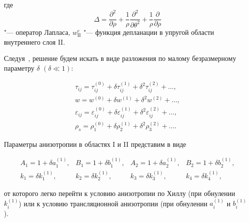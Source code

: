 где $$\Delta=\dfrac{\partial^2}{\partial\rho}+\dfrac1{\rho}\dfrac{\partial^2}{\partial\theta^2}+\dfrac1{\rho}\dfrac{\partial}{\partial\rho}$$ "--- оператор Лапласа, $w_{\mathrm{II}}^e$ "--- функция депланации в упругой области внутреннего слоя II.



Следуя~\cite{kovalev:bibl_2}, решение будем искать в виде разложения по малому безразмерному параметру $\delta$ $(\delta\ll 1)$:

 \begin{equation}

\label{kovalev:eq_20}

  \begin{array}{c}

    \tau_{ij}=\tau_{ij}^{(0)}+\delta\tau_{ij}^{(1)}+\delta^2\tau_{ij}^{(2)}+\ldots, \\[2mm]

    w=w^{(0)}+\delta w^{(1)}+\delta^2w^{(2)}+\ldots, \\[2mm]

    \varepsilon_{ij}=\varepsilon_{ij}^{(0)}+\delta\varepsilon_{ij}^{(1)}+\delta^2\varepsilon_{ij}^{(2)}+\ldots, \\[2mm]

    \rho_s=\rho_1^{(0)}+\delta\rho_2^{(1)}+\delta^2\rho_3^{(2)}+\ldots .

  \end{array}

 \end{equation}





Параметры анизотропии в областях I и II представим в виде~\cite{kovalev:bibl_12}

  \begin{equation}\label{kovalev:eq_21}

    \begin{array}{llll}

      A_1=1+\delta a_1^{(1)}, & B_1=1+\delta b_1^{(1)},  &       A_2=1+\delta a_2^{(1)}, & B_2=1+\delta b_2^{(1)}, \\

      k_1=\delta k_1^{(1)}, & k_2=\delta k_2^{(1)}, &       k_3=\delta k_3^{(1)}, & k_4=\delta k_4^{(1)},

    \end{array}

  \end{equation}

от которого легко перейти к условию анизотропии по Хиллу (при обнулении $k_i^{(1)}$) или к условию трансляционной анизотропии (при обнулении $a_i^{(1)}$ и $b_i^{(1)}$).

